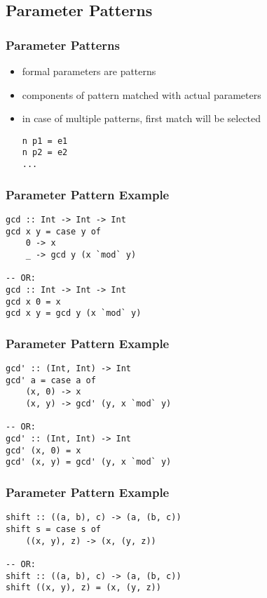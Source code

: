\documentclass[dvipsnames]{beamer}
\theoremstyle{plain}
\begin{document}
\subsection{Parameter Patterns}

\begin{frame}[fragile]
  \frametitle{Parameter Patterns}

  \begin{itemize}
    \item formal parameters are patterns
    \item components of pattern matched with actual parameters

    \medskip
    \item in case of multiple patterns, first match will be selected

    \smallskip
    \begin{lstlisting}[style=syntax]
n p1 = e1
n p2 = e2
...
    \end{lstlisting}
  \end{itemize}
\end{frame}

\begin{frame}[fragile]
  \frametitle{Parameter Pattern Example}

  \begin{lstlisting}
gcd :: Int -> Int -> Int
gcd x y = case y of
    0 -> x
    _ -> gcd y (x `mod` y)

-- OR:
gcd :: Int -> Int -> Int
gcd x 0 = x
gcd x y = gcd y (x `mod` y)
  \end{lstlisting}
\end{frame}

\begin{frame}[fragile]
  \frametitle{Parameter Pattern Example}

  \begin{lstlisting}
gcd' :: (Int, Int) -> Int
gcd' a = case a of
    (x, 0) -> x
    (x, y) -> gcd' (y, x `mod` y)

-- OR:
gcd' :: (Int, Int) -> Int
gcd' (x, 0) = x
gcd' (x, y) = gcd' (y, x `mod` y)
  \end{lstlisting}
\end{frame}

\begin{frame}[fragile]
  \frametitle{Parameter Pattern Example}

  \begin{lstlisting}
shift :: ((a, b), c) -> (a, (b, c))
shift s = case s of
    ((x, y), z) -> (x, (y, z))

-- OR:
shift :: ((a, b), c) -> (a, (b, c))
shift ((x, y), z) = (x, (y, z))
  \end{lstlisting}
\end{frame}
\end{document}
